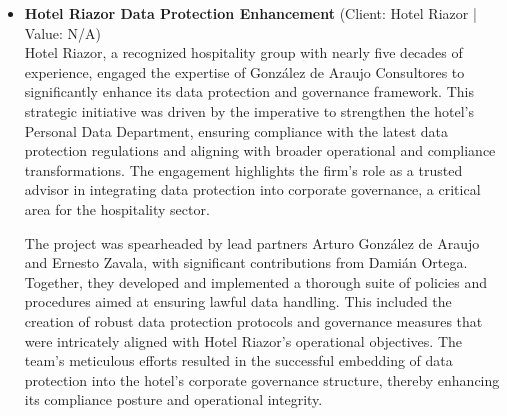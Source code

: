 \documentclass[11pt]{article}
\begin{document}
\begin{itemize}
The project commenced with a meticulous assessment of Biocodex's existing data management practices. This thorough evaluation informed the development of a tailored framework that was specifically aligned with Biocodex's operational needs and regulatory obligations. The framework not only ensured compliance with stringent industry regulations but also positioned Biocodex as a leader in data protection within the pharmaceutical sector.

This matter demonstrates González de Araujo Consultores' strategic role in embedding data protection into the core of corporate governance for its clients. The successful implementation of this framework highlights the firm's capability to deliver bespoke solutions that enhance regulatory compliance and operational integrity, aligning with the firm's editorial thesis of providing strategic advisory services to significant Mexican and multinational clients.
\item \textbf{Hotel Riazor Data Protection Enhancement} (Client: Hotel Riazor | Value: N/A)\\ Hotel Riazor, a recognized hospitality group with nearly five decades of experience, engaged the expertise of González de Araujo Consultores to significantly enhance its data protection and governance framework. This strategic initiative was driven by the imperative to strengthen the hotel's Personal Data Department, ensuring compliance with the latest data protection regulations and aligning with broader operational and compliance transformations. The engagement highlights the firm's role as a trusted advisor in integrating data protection into corporate governance, a critical area for the hospitality sector.

The project was spearheaded by lead partners Arturo González de Araujo and Ernesto Zavala, with significant contributions from Damián Ortega. Together, they developed and implemented a thorough suite of policies and procedures aimed at ensuring lawful data handling. This included the creation of robust data protection protocols and governance measures that were intricately aligned with Hotel Riazor's operational objectives. The team's meticulous efforts resulted in the successful embedding of data protection into the hotel's corporate governance structure, thereby enhancing its compliance posture and operational integrity.


\end{itemize}
\end{document}
